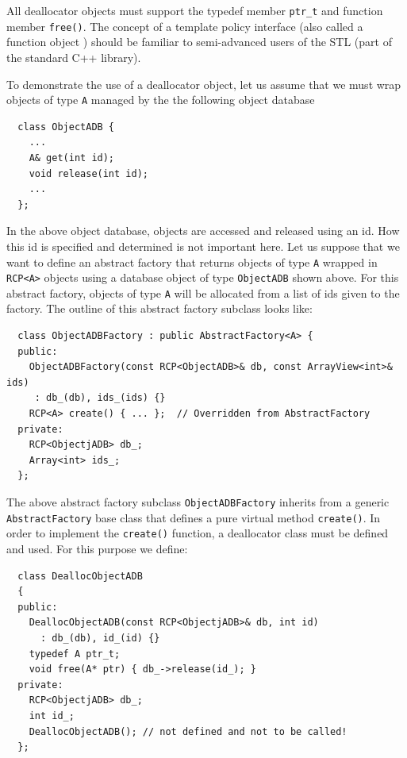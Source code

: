 \documentclass[pdf,ps2pdf,11pt]{SANDreport}
\begin{document}
All deallocator objects must support the typedef member
{}\texttt{ptr\_t} and function member {}\texttt{free()}.  The concept
of a template policy interface (also called a function object
\cite[Section 18.4]{stroustrup97}) should be familiar to
semi-advanced users of the STL (part of the standard C++ library).

To demonstrate the use of a deallocator object, let us assume that we
must wrap objects of type {}\texttt{A} managed by the the following
object database

{\small\begin{verbatim}
  class ObjectADB {
    ...
    A& get(int id);
    void release(int id);
    ...
  };
\end{verbatim}}

In the above object database, objects are accessed and released using
an id.  How this id is specified and determined is not important here.
Let us suppose that we want to define an abstract factory that returns
objects of type {}\texttt{A} wrapped in {}\texttt{RCP<A>} objects
using a database object of type {}\texttt{ObjectADB} shown above.  For
this abstract factory, objects of type {}\texttt{A} will be allocated
from a list of ids given to the factory.  The outline of this abstract
factory subclass looks like:

{\small\begin{verbatim}
  class ObjectADBFactory : public AbstractFactory<A> {
  public:
    ObjectADBFactory(const RCP<ObjectADB>& db, const ArrayView<int>& ids)
     : db_(db), ids_(ids) {}
    RCP<A> create() { ... };  // Overridden from AbstractFactory
  private:
    RCP<ObjectjADB> db_;
    Array<int> ids_;
  };
\end{verbatim}}

The above abstract factory subclass {}\texttt{ObjectADBFactory}
inherits from a generic {}\texttt{AbstractFactory} base class that
defines a pure virtual method {}\texttt{create()}.  In order to
implement the {}\texttt{create()} function, a deallocator class must
be defined and used.  For this purpose we define:

{\small\begin{verbatim}
  class DeallocObjectADB
  {
  public:
    DeallocObjectADB(const RCP<ObjectjADB>& db, int id)
      : db_(db), id_(id) {}
    typedef A ptr_t;
    void free(A* ptr) { db_->release(id_); }
  private:
    RCP<ObjectjADB> db_;
    int id_;
    DeallocObjectADB(); // not defined and not to be called!
  };
\end{verbatim}}
\end{document}
